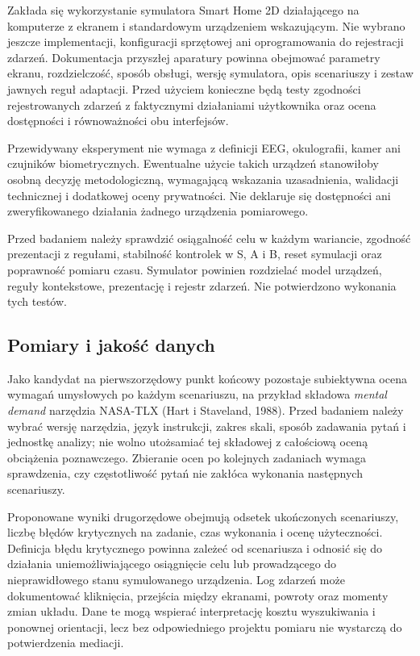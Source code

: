 \documentclass[11pt,a4paper]{article}
\begin{document}
Zakłada się wykorzystanie symulatora Smart Home 2D działającego na komputerze z ekranem i standardowym urządzeniem wskazującym. Nie wybrano jeszcze implementacji, konfiguracji sprzętowej ani oprogramowania do rejestracji zdarzeń. Dokumentacja przyszłej aparatury powinna obejmować parametry ekranu, rozdzielczość, sposób obsługi, wersję symulatora, opis scenariuszy i zestaw jawnych reguł adaptacji. Przed użyciem konieczne będą testy zgodności rejestrowanych zdarzeń z faktycznymi działaniami użytkownika oraz ocena dostępności i równoważności obu interfejsów.

Przewidywany eksperyment nie wymaga z definicji EEG, okulografii, kamer ani czujników biometrycznych. Ewentualne użycie takich urządzeń stanowiłoby osobną decyzję metodologiczną, wymagającą wskazania uzasadnienia, walidacji technicznej i dodatkowej oceny prywatności. Nie deklaruje się dostępności ani zweryfikowanego działania żadnego urządzenia pomiarowego.

Przed badaniem należy sprawdzić osiągalność celu w każdym wariancie, zgodność prezentacji z regułami, stabilność kontrolek w S, A i B, reset symulacji oraz poprawność pomiaru czasu. Symulator powinien rozdzielać model urządzeń, reguły kontekstowe, prezentację i rejestr zdarzeń. Nie potwierdzono wykonania tych testów.

\subsection{Pomiary i jakość danych}

Jako kandydat na pierwszorzędowy punkt końcowy pozostaje subiektywna ocena wymagań umysłowych po każdym scenariuszu, na przykład składowa \textit{mental demand} narzędzia NASA-TLX (Hart i Staveland, 1988). Przed badaniem należy wybrać wersję narzędzia, język instrukcji, zakres skali, sposób zadawania pytań i jednostkę analizy; nie wolno utożsamiać tej składowej z całościową oceną obciążenia poznawczego. Zbieranie ocen po kolejnych zadaniach wymaga sprawdzenia, czy częstotliwość pytań nie zakłóca wykonania następnych scenariuszy.

Proponowane wyniki drugorzędowe obejmują odsetek ukończonych scenariuszy, liczbę błędów krytycznych na zadanie, czas wykonania i ocenę użyteczności. Definicja błędu krytycznego powinna zależeć od scenariusza i odnosić się do działania uniemożliwiającego osiągnięcie celu lub prowadzącego do nieprawidłowego stanu symulowanego urządzenia. Log zdarzeń może dokumentować kliknięcia, przejścia między ekranami, powroty oraz momenty zmian układu. Dane te mogą wspierać interpretację kosztu wyszukiwania i ponownej orientacji, lecz bez odpowiedniego projektu pomiaru nie wystarczą do potwierdzenia mediacji.
\end{document}
